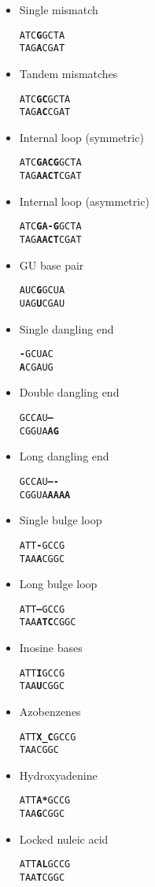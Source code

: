 \documentclass{article}
\begin{document}
\begin{itemize}
\item Single mismatch 
\begin{alltt}
ATC\textbf{G}GCTA
TAG\textbf{A}CGAT
\end{alltt}
\item Tandem mismatches 
\begin{alltt}
ATC\textbf{GC}GCTA
TAG\textbf{AC}CGAT
\end{alltt}
\item Internal loop (symmetric)
\begin{alltt}
ATC\textbf{GACG}GCTA
TAG\textbf{AACT}CGAT
\end{alltt}
\item Internal loop (asymmetric)
\begin{alltt}
ATC\textbf{GA-G}GCTA
TAG\textbf{AACT}CGAT
\end{alltt}
\item GU base pair
\begin{alltt}
AUC\textbf{G}GCUA
UAG\textbf{U}CGAU
\end{alltt}
\item Single dangling end
\begin{alltt}
\textbf{-}GCUAC
\textbf{A}CGAUG
\end{alltt}
\item Double dangling end
\begin{alltt}
GCCAU\textbf{--}
CGGUA\textbf{AG}
\end{alltt}
\item Long dangling end
\begin{alltt}
GCCAU\textbf{----}
CGGUA\textbf{AAAA}
\end{alltt}
\item Single bulge loop 
\begin{alltt}
ATT\textbf{-}GCCG
TAA\textbf{A}CGGC
\end{alltt}
\item Long bulge loop 
\begin{alltt}
ATT\textbf{---}GCCG
TAA\textbf{ATC}CGGC
\end{alltt}
\item Inosine bases 
\begin{alltt}
ATT\textbf{I}GCCG
TAA\textbf{U}CGGC
\end{alltt}
\item Azobenzenes 
\begin{alltt}
ATT\textbf{X\_C}GCCG
TAACGGC
\end{alltt}
\item Hydroxyadenine 
\begin{alltt}
ATT\textbf{A*}GCCG
TAA\textbf{G}CGGC
\end{alltt}
\item Locked nuleic acid 
\begin{alltt}
ATT\textbf{AL}GCCG
TAA\textbf{T}CGGC
\end{alltt}
\end{itemize}
\end{document}
